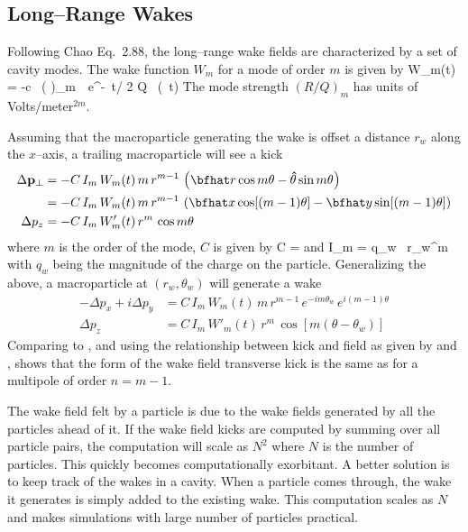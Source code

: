 \subsection{Long--Range Wakes}

Following Chao\cite{b:chao} Eq.~2.88, the long--range wake fields are
characterized by a set of cavity modes. The wake function $W_m$ for a
mode of order $m$ is given by
\Begineq
  W_m(t) = -c \, \left(  \right)_m \,\,
  e^{-\omega \, t/ 2 Q} \, \sin (\omega \, t)
  \label{wcrq}
\Endeq
The mode strength $(R/Q)_m$ has units of Volts/meter$^{2m}$.

Assuming that the macroparticle generating the wake is offset a
distance $r_w$ along the $x$--axis, a trailing macroparticle will see a kick
\begin{align}
  \Delta {\Bf p}_\perp &= 
    -C \, I_m \, W_m(t) \, m \, r^{m-1} \, \left( 
    \bfhat r \cos m\theta - {\bf\hat\theta} \sin m\theta \right) \\
  &= -C \, I_m \, W_m(t) \, m \, r^{m-1} \, \left( 
    \bfhat x \cos [(m-1) \theta] - 
    \bfhat y \sin [(m-1)\theta] \right) \CRNO
  \Delta p_z &= -C \, I_m \, W'_m(t) \, r^m \, \cos m\theta
\end{align}
where $m$ is the order of the mode, $C$ is given by
\Begineq
  C = 
\Endeq
 and
\Begineq
  I_m = q_w \, r_w^m
\Endeq
with $q_w$ being the magnitude of the charge on the particle. 
Generalizing the above, a macroparticle at $(r_w, \theta_w)$ will generate a wake
\begin{align}
  -\Delta p_x + i\Delta p_y &= C \, I_m \, W_m(t) \, 
    m \, r^{m-1} \, e^{-i m \theta_w} \, e^{i (m-1) \theta} 
    \label{ppcimr} \\
  \Delta p_z &= C \, I_m \, W'_m(t) \, r^m \, \cos [m(\theta - \theta_w)]
    \label{pciwr}
\end{align}
Comparing  to , and using the relationship between
kick and field as given by  and , shows that
the form of the wake field transverse kick is the same as for a
multipole of order $n = m - 1$. 

The wake field felt by a particle is due to the wake fields generated by
all the particles ahead of it. If the wake field kicks are computed by
summing over all particle pairs, the
computation will scale as $N^2$ where $N$ is the number of
particles. This quickly becomes computationally exorbitant. A better
solution is to keep track of the wakes in a cavity. When a particle
comes through, the wake it generates is simply added to the existing
wake. This computation scales as $N$ and makes simulations with large
number of particles practical. 

